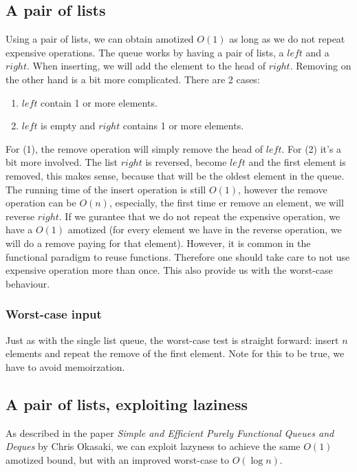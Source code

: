 \subsection*{A pair of lists}
Using a pair of lists, we can obtain amotized $O(1)$ as long as we do not repeat expensive operations. The queue works by having a pair of lists, a $left$ and a $right$. When inserting, we will add the element to the head of $right$. Removing on the other hand is a bit more complicated. There are 2 cases:
\begin{enumerate}
	\item $left$ contain 1 or more elements.
	\item $left$ is empty and $right$ contains 1 or more elements.
\end{enumerate}
For (1), the remove operation will simply remove the head of $left$. For (2) it's a bit more involved. The list $right$ is reversed, become $left$ and the first element is removed, this makes sense, because that will be the oldest element in the queue. The running time of the insert operation is still $O(1)$, however the remove operation can be $O(n)$, especially, the first time er remove an element, we will reverse $right$. If we gurantee that we do not repeat the expensive operation, we have a $O(1)$ amotized (for every element we have in the reverse operation, we will do a remove paying for that element). However, it is common in the functional paradigm to reuse functions. Therefore one should take care to not use expensive operation more than once. This also provide us with the worst-case behaviour.

\subsubsection{Worst-case input}
Just as with the single list queue, the worst-case test is straight forward: insert $n$ elements and repeat the remove of the first element. Note for this to be true, we have to avoid memoirzation.

\subsection*{A pair of lists, exploiting laziness}
As described in the paper \textit{Simple and Efficient Purely Functional Queues and Deques} by Chris Okasaki, we can exploit lazyness to achieve the same $O(1)$ amotized bound, but with an improved worst-case to $O(\log n)$.

